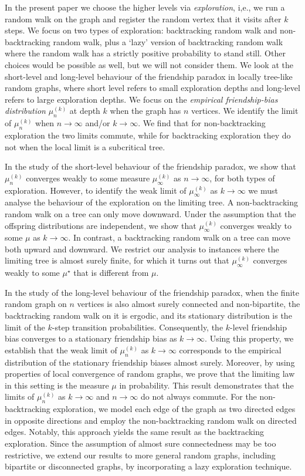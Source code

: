 \documentclass[11pt]{article}
\numberwithin{equation}{section}
\theoremstyle{plain}
\begin{document}
In the present paper we choose the higher levels via \emph{exploration}, i,e., we run a random walk on the graph and register the random vertex that it visits after $k$ steps. We focus on two types of exploration: backtracking random walk and non-backtracking random walk, plus a `lazy' version of backtracking random walk where the random walk has a strictly positive probability to stand still. Other choices would be possible as well, but we will not consider them. We look at the short-level and long-level behaviour of the friendship paradox in locally tree-like random graphs, where short level refers to small exploration depths and long-level refers to large exploration depths. We focus on the \emph{empirical friendship-bias distribution} $\mu_n^{(k)}$ at depth $k$ when the graph has $n$ vertices. We identify the limit of $\mu_n^{(k)}$ when $n\to\infty$ and/or $k\to\infty$. We find that for non-backtracking exploration the two limits commute, while for backtracking exploration they do not when the local limit is a subcritical tree. 

In the study of the short-level behaviour of the friendship paradox, we show that $\mu_n^{(k)}$ converges weakly to some measure $\mu_\infty^{(k)}$ as $n\to\infty$, for both types of exploration. However, to identify the weak limit of $\mu_\infty^{(k)}$ as $k\to\infty$ we must analyse the behaviour of the exploration on the limiting tree. A non-backtracking random walk on a tree can only move downward. Under the assumption that the offspring distributions are independent, we show that $\mu_\infty^{(k)}$ converges weakly to some $\mu$ as $k\to\infty$. In contrast, a backtracking random walk on a tree can move both upward and downward. We restrict our analysis to instances where the limiting tree is almost surely finite, for which it turns out that $\mu_\infty^{(k)}$ converges weakly to some $\mu^{\star}$ that is different from $\mu$.

In the study of the long-level behaviour of the friendship paradox, when the finite random graph on $n$ vertices is also almost surely connected and non-bipartite, the backtracking random walk on it is ergodic, and its stationary distribution is the limit of the $k$-step transition probabilities. Consequently, the $k$-level friendship bias converges to a stationary friendship bias as $k\to\infty$. Using this property, we establish that the weak limit of $\mu_n^{(k)}$ as $k\to\infty$ corresponds to the empirical distribution of the stationary friendship biases almost surely. Moreover, by using properties of local convergence of random graphs, we prove that the limiting law in this setting is the measure $\mu$ in probability. This result demonstrates that the limits of $\mu_n^{(k)}$ as $k\to\infty$ and $n\to\infty$ do not always commute. For the non-backtracking exploration, we model each edge of the graph as two directed edges in opposite directions and employ the non-backtracking random walk on directed edges. Notably, this approach yields the same result as the backtracking exploration. Since the assumption of almost sure connectedness may be too restrictive, we extend our results to more general random graphs, including bipartite or disconnected graphs, by incorporating a lazy exploration technique.
\end{document}
